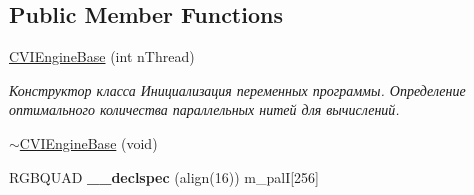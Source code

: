 \subsection*{Public Member Functions}
\begin{DoxyCompactItemize}
\item 
\hyperlink{class_c_v_i_engine_base_a1349de29adc90869f463b17fb03904c1}{C\+V\+I\+Engine\+Base} (int n\+Thread)
\begin{DoxyCompactList}\small\item\em Конструктор класса Инициализация переменных программы. Определение оптимального количества параллельных нитей для вычислений. \end{DoxyCompactList}\item 
\hyperlink{class_c_v_i_engine_base_a28dba2a06eda33294836c5241f497112}{$\sim$\+C\+V\+I\+Engine\+Base} (void)
\item 
\hypertarget{class_c_v_i_engine_base_acd0542a6476a6eed4568c900ab5af5d9}{R\+G\+B\+Q\+U\+A\+D {\bfseries \+\_\+\+\_\+declspec} (align(16)) m\+\_\+pal\+I\mbox{[}256\mbox{]}}\label{class_c_v_i_engine_base_acd0542a6476a6eed4568c900ab5af5d9}


\end{DoxyCompactItemize}

